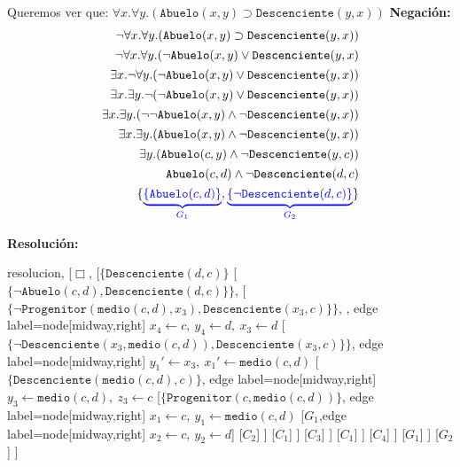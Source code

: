 \documentclass[10pt,a4paper]{article}
\begin{document}
Queremos ver que: $\forall x. \forall y. (\texttt{Abuelo}(x,y) \supset \texttt{Descenciente}(y,x))$ 
\textbf{Negación:}
\begin{align*}
\lnot\forall x. \forall y. (\texttt{Abuelo}(x,y) \supset \texttt{Descenciente}(y,x)) \\[1pt]
\lnot\forall x. \forall y. (\lnot \texttt{Abuelo}(x,y) \lor \texttt{Descenciente}(y,x) \\[1pt]
\exists x. \lnot \forall y. (\lnot \texttt{Abuelo}(x,y) \lor \texttt{Descenciente}(y,x)) \\[1pt]
\exists x. \exists y. \lnot (\lnot \texttt{Abuelo}(x,y) \lor \texttt{Descenciente}(y,x))\\[1pt]
\exists x. \exists y. (\lnot \lnot \texttt{Abuelo}(x,y) \land \lnot \texttt{Descenciente}(y,x))\\[1pt]
\exists x. \exists y. (\texttt{Abuelo}(x,y) \land \lnot \texttt{Descenciente}(y,x))\\[1pt]
\exists y. (\texttt{Abuelo}(c,y) \land \lnot \texttt{Descenciente}(y,c))\\[1pt]
\texttt{Abuelo}(c,d) \land \lnot \texttt{Descenciente}(d,c)\\[1pt]
\{{\color{blue}\underbrace{\{\texttt{Abuelo}(c,d)\}}_{G_1}},{\color{blue}\underbrace{\{\lnot \texttt{Descenciente}(d,c)\}}_{G_2}}\}\\[1pt]
\end{align*}

\textbf{Resolución:}
\begin{center}
	\begin{forest} resolucion,
[$\Box$,
    [$\{\texttt{Descenciente}(d\comma c)\}$
        [$\{ \lnot \texttt{Abuelo}(c\comma d) \comma \texttt{Descenciente}(d\comma c)\}\}$,
            [ $\{ \lnot \texttt{Progenitor}(\texttt{medio}(c\comma d)\comma x_3)\comma \texttt{Descenciente}(x_3\comma c)\}\}$,
            , edge label={node[midway,right] {$x_4\leftarrow c,~y_4 \leftarrow d,~x_3\leftarrow d$}}
                [$\{ \lnot \texttt{Descenciente}(x_3\comma \texttt{medio}(c\comma d))\comma \texttt{Descenciente}(x_3\comma c)\}\}$,
                 edge label={node[midway,right] {$y_1'\leftarrow x_3,~x_1' \leftarrow \texttt{medio}(c,d)$}}
                    [$\{\texttt{Descenciente}(\texttt{medio}(c\comma d) \comma c)\}$, edge label={node[midway,right] {$y_3\leftarrow \texttt{medio}(c,d),~z_3 \leftarrow c$}}
                        [$\{ \texttt{Progenitor}(c\comma \texttt{medio}(c\comma d))\}$, edge label={node[midway,right] {$x_1\leftarrow c,~y_1\leftarrow \texttt{medio}(c,d)$}}
                            [$G_1$,edge label={node[midway,right] {$x_2\leftarrow c,~y_2\leftarrow d$}}]
                            [$C_2$]
                        ]
                        [$C_1$]
                    ]
                    [$C_3$]
                ]
                [$C_1$]
            ]
            [$C_4$]
        ]
        [$G_1$]
    ]
    [$G_2$]
]
	\end{forest}
\end{center}
\end{document}
